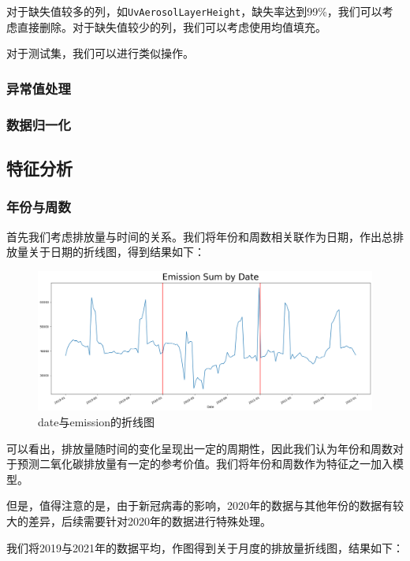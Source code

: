 \documentclass{ctexart}
\begin{document}
对于缺失值较多的列，如\texttt{UvAerosolLayerHeight}，缺失率达到99\%，我们可以考虑直接删除。对于缺失值较少的列，我们可以考虑使用均值填充。

对于测试集，我们可以进行类似操作。

\subsubsection{异常值处理}

\subsubsection{数据归一化}

\subsection{特征分析}

\subsubsection{年份与周数}

首先我们考虑排放量与时间的关系。我们将年份和周数相关联作为日期，作出总排放量关于日期的折线图，得到结果如下：

\begin{figure}[H]
      \centering
      \includegraphics[width=1\textwidth]{output2.png}
      \caption{date与emission的折线图}
\end{figure}

可以看出，排放量随时间的变化呈现出一定的周期性，因此我们认为年份和周数对于预测二氧化碳排放量有一定的参考价值。我们将年份和周数作为特征之一加入模型。

但是，值得注意的是，由于新冠病毒的影响，2020年的数据与其他年份的数据有较大的差异，后续需要针对2020年的数据进行特殊处理。

我们将2019与2021年的数据平均，作图得到关于月度的排放量折线图，结果如下：
\end{document}
